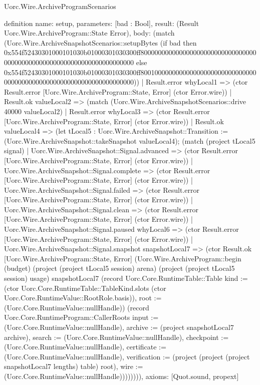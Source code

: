 \begin{lexlean}{Uorc.Wire.ArchiveProgramScenarios}
\begin{semanticmodule}
definition{
  name: setup,
  parameters: [bad : Bool],
  result: (Result Uorc.Wire.ArchiveProgram::State Error),
  body: (match (Uorc.Wire.ArchiveSnapshotScenarios::setupBytes (if bad then 0x554f52430301000101030b01000301030300ff8000000000000000000000000000000000000000000000000000000000000000000000 else 0x554f52430301000101030b01000301030300ff8001000000000000000000000000000000000000000000000000000000000000000000))
    | Result.error whyLocal1 => (ctor Result.error [Uorc.Wire.ArchiveProgram::State, Error] (ctor Error.wire))
    | Result.ok valueLocal2 => (match (Uorc.Wire.ArchiveSnapshotScenarios::drive 40000 valueLocal2)
      | Result.error whyLocal3 => (ctor Result.error [Uorc.Wire.ArchiveProgram::State, Error] (ctor Error.wire))
      | Result.ok valueLocal4 => (let tLocal5 : Uorc.Wire.ArchiveSnapshot::Transition := (Uorc.Wire.ArchiveSnapshot::takeSnapshot valueLocal4); (match (project tLocal5 signal)
        | Uorc.Wire.ArchiveSnapshot::Signal.advanced => (ctor Result.error [Uorc.Wire.ArchiveProgram::State, Error] (ctor Error.wire))
        | Uorc.Wire.ArchiveSnapshot::Signal.complete => (ctor Result.error [Uorc.Wire.ArchiveProgram::State, Error] (ctor Error.wire))
        | Uorc.Wire.ArchiveSnapshot::Signal.failed => (ctor Result.error [Uorc.Wire.ArchiveProgram::State, Error] (ctor Error.wire))
        | Uorc.Wire.ArchiveSnapshot::Signal.clean => (ctor Result.error [Uorc.Wire.ArchiveProgram::State, Error] (ctor Error.wire))
        | Uorc.Wire.ArchiveSnapshot::Signal.paused whyLocal6 => (ctor Result.error [Uorc.Wire.ArchiveProgram::State, Error] (ctor Error.wire))
        | Uorc.Wire.ArchiveSnapshot::Signal.snapshot snapshotLocal7 => (ctor Result.ok [Uorc.Wire.ArchiveProgram::State, Error] (Uorc.Wire.ArchiveProgram::begin (budget) (project (project tLocal5 session) arena) (project (project tLocal5 session) usage) snapshotLocal7 (record Uorc.Core.RuntimeTable::Table {kind := (ctor Uorc.Core.RuntimeTable::TableKind.slots (ctor Uorc.Core.RuntimeValue::RootRole.basis)), root := (Uorc.Core.RuntimeValue::nullHandle)}) (record Uorc.Core.RuntimeProgram::CallerRoots {input := (Uorc.Core.RuntimeValue::nullHandle), archive := (project snapshotLocal7 archive), search := (Uorc.Core.RuntimeValue::nullHandle), checkpoint := (Uorc.Core.RuntimeValue::nullHandle), certificate := (Uorc.Core.RuntimeValue::nullHandle), verification := (project (project (project snapshotLocal7 lengths) table) root), wire := (Uorc.Core.RuntimeValue::nullHandle)}))))))),
  axioms: [Quot.sound, propext]
}


\end{semanticmodule}
\end{lexlean}
